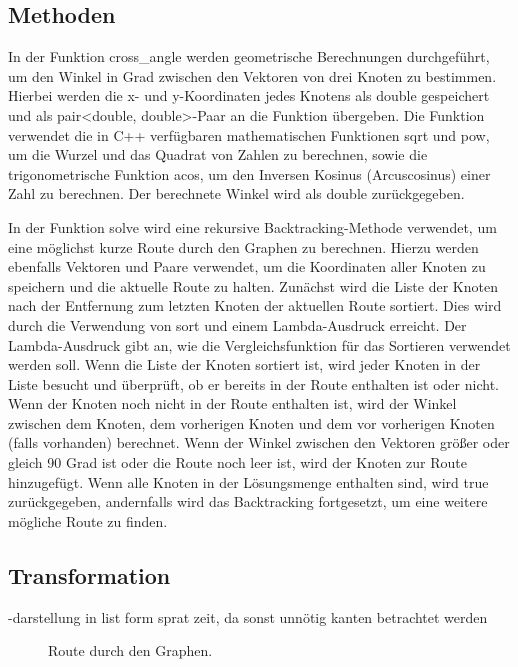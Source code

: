 \documentclass[a4paper,10pt,ngerman]{scrartcl}
\begin{document}
    \subsection{Methoden}\label{subsec:methoden}
    In der Funktion cross\_angle werden geometrische Berechnungen durchgeführt, um den Winkel in Grad zwischen den Vektoren von drei Knoten zu bestimmen.
    Hierbei werden die x- und y-Koordinaten jedes Knotens als double gespeichert und als pair<double, double>-Paar an die Funktion übergeben.
    Die Funktion verwendet die in C++ verfügbaren mathematischen Funktionen sqrt und pow, um die Wurzel und das Quadrat von Zahlen zu berechnen,
    sowie die trigonometrische Funktion acos, um den Inversen Kosinus (Arcuscosinus) einer Zahl zu berechnen.
    Der berechnete Winkel wird als double zurückgegeben.
    \newline

    In der Funktion solve wird eine rekursive Backtracking-Methode verwendet, um eine möglichst kurze Route durch den Graphen zu berechnen.
    Hierzu werden ebenfalls Vektoren und Paare verwendet, um die Koordinaten aller Knoten zu speichern und die aktuelle Route zu halten.
    Zunächst wird die Liste der Knoten nach der Entfernung zum letzten Knoten der aktuellen Route sortiert.
    Dies wird durch die Verwendung von sort und einem Lambda-Ausdruck erreicht.
    Der Lambda-Ausdruck gibt an, wie die Vergleichsfunktion für das Sortieren verwendet werden soll.
    Wenn die Liste der Knoten sortiert ist, wird jeder Knoten in der Liste besucht und überprüft, ob er bereits in der Route enthalten ist oder nicht.
    Wenn der Knoten noch nicht in der Route enthalten ist, wird der Winkel zwischen dem Knoten, dem vorherigen Knoten und dem vor vorherigen Knoten (falls vorhanden) berechnet.
    Wenn der Winkel zwischen den Vektoren größer oder gleich 90 Grad ist oder die Route noch leer ist, wird der Knoten zur Route hinzugefügt.
    Wenn alle Knoten in der Lösungsmenge enthalten sind, wird true zurückgegeben, andernfalls wird das Backtracking fortgesetzt, um eine weitere mögliche Route zu finden.

    \subsection{Transformation}\label{subsec:transformation}

    -darstellung in list form sprat zeit, da sonst unnötig kanten betrachtet werden


    \begin{figure}[htbp]
        \centering
        \caption{Route durch den Graphen.}\label{fig:figure}
    \end{figure}
\end{document}
